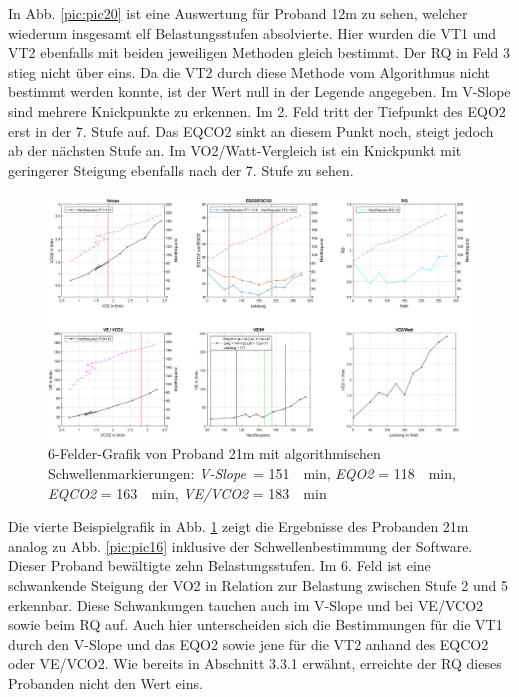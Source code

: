 %
In Abb. \ref{pic:pic20} ist eine Auswertung für Proband 12m zu sehen, welcher wiederum insgesamt elf Belastungsstufen absolvierte. Hier wurden die VT1 und VT2 ebenfalls mit beiden jeweiligen Methoden gleich bestimmt. Der RQ in Feld 3 stieg nicht über eins. Da die VT2 durch diese Methode vom Algorithmus nicht bestimmt werden konnte, ist der Wert null in der Legende angegeben. Im V-Slope sind mehrere Knickpunkte zu erkennen. Im 2. Feld tritt der Tiefpunkt des \gls{EQO2} erst in der 7. Stufe auf. Das \gls{EQCO2} sinkt an diesem Punkt noch, steigt jedoch ab der nächsten Stufe an. Im \gls{VO2}/Watt-Vergleich ist ein Knickpunkt mit geringerer Steigung ebenfalls nach der 7. Stufe zu sehen.
%
\begin{figure}[H]
	\centering
	\noindent\includegraphics[angle=0,width=\linewidth,keepaspectratio]{Bilder/auto_21}
	\caption[6-Felder-Grafik von Proband 21m mit algorithmischen Schwellenmarkierungen]{6-Felder-Grafik von Proband 21m mit algorithmischen Schwellenmarkierungen: \textsl{V-Slope}~= \SI{151}{\per\minute}, \textsl{\gls{EQO2}} = \SI{118}{\per\minute}, \textsl{\gls{EQCO2}} = \SI{163}{\per\minute}, \textsl{\gls{VE}/\gls{VCO2}} = \SI{183}{\per\minute}}
	\label{pic:pic21}
\end{figure}
%
Die vierte Beispielgrafik in Abb. \ref{pic:pic21} zeigt die Ergebnisse des Probanden 21m analog zu Abb. \ref{pic:pic16} inklusive der Schwellenbestimmung der Software. Dieser Proband bewältigte zehn Belastungsstufen. Im 6. Feld ist eine schwankende Steigung der \gls{VO2} in Relation zur Belastung zwischen Stufe 2 und 5 erkennbar. Diese Schwankungen tauchen auch im V-Slope und bei \gls{VE}/\gls{VCO2} sowie beim RQ auf. Auch hier unterscheiden sich die Bestimmungen für die VT1 durch den V-Slope und das \gls{EQO2} sowie jene für die VT2 anhand des \gls{EQCO2} oder \gls{VE}/\gls{VCO2}. Wie bereits in Abschnitt 3.3.1 erwähnt, erreichte der RQ dieses Probanden nicht den Wert eins.
%
